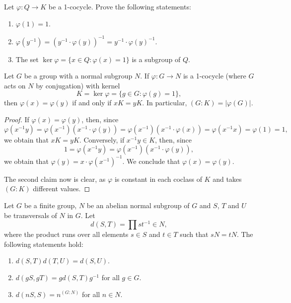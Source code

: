 \begin{exercise}
\label{xca:1cocycle}
Let $\varphi\colon Q\to K$ be a 1-cocycle. Prove the following statements:
\begin{enumerate}
	\item $\varphi(1)=1$.
	\item $\varphi(y^{-1})=(y^{-1}\cdot\varphi(y))^{-1}=y^{-1}\cdot\varphi(y)^{-1}$.
	\item The set $\ker\varphi=\{x\in Q:\varphi(x)=1\}$ is a subgroup of $Q$. 
\end{enumerate}
\end{exercise}

\begin{lemma}
\label{lem:1cocycle}
Let $G$ be a group with a normal subgroup $N$. 
If $\varphi\colon G\to N$ is a 1-cocycle (where $G$ acts on $N$ by conjugation)
with kernel 
\[
K=\ker\varphi=\{g\in G:\varphi(g)=1\}, 
\]
then 
$\varphi(x)=\varphi(y)$ if and only if $xK=yK$. In particular,
$(G:K)=|\varphi(G)|$. 
\end{lemma}

\begin{proof}
If $\varphi(x)=\varphi(y)$, then, since  
\[
\varphi(x^{-1}y)
=\varphi(x^{-1})(x^{-1}\cdot\varphi(y))
=\varphi(x^{-1})(x^{-1}\cdot\varphi(x))
=\varphi(x^{-1}x)=\varphi(1)
=1,
\]
we obtain that $xK=yK$. Conversely, if $x^{-1}y\in K$, then, since 
\[
1=\varphi(x^{-1}y)=\varphi(x^{-1})(x^{-1}\cdot \varphi(y)),
\]
we obtain that $\varphi(y)=x\cdot\varphi(x^{-1})^{-1}$. We conclude that 
$\varphi(x)=\varphi(y)$.

The second claim now is clear, as $\varphi$ is constant in each coclass of $K$ 
and takes $(G:K)$ different values. 
\end{proof}

\begin{lemma}
	\label{lem:d}
	Let $G$ be a finite group, $N$ be an abelian normal subgroup of $G$ and $S$, $T$ and $U$
    be transversals of $N$ in $G$. Let 
	\[
	d(S,T)=\prod st^{-1}\in N,
	\]
	where the product runs over all elements $s\in S$ and $t\in T$ such that 
	$sN=tN$. The following statements hold: 
	\begin{enumerate}
		\item $d(S,T)d(T,U)=d(S,U)$.
		\item $d(gS,gT)=gd(S,T)g^{-1}$ for all $g\in G$.
		\item $d(nS,S)=n^{(G:N)}$ for all $n\in N$.
	\end{enumerate}
\end{lemma}

